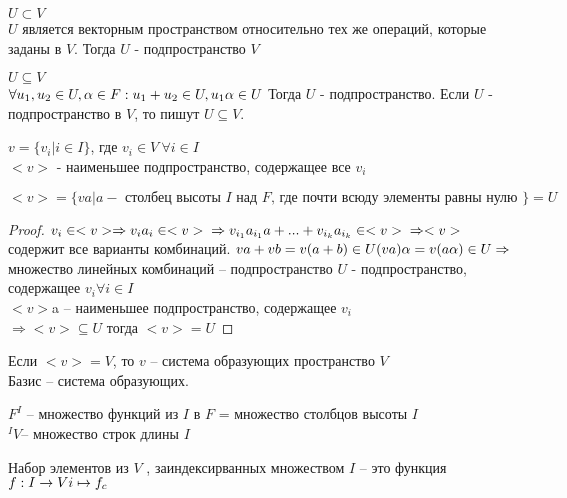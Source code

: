 \documentclass[12pt]{report}
\begin{document}
\begin{note}
$U \subset V$\\
$U$ является векторным пространством относительно тех же операций, которые заданы в $V$.
Тогда $U$ - подпространство $V$\\
\end{note}

\begin{lm}
$U \subseteq V$\\
$\forall u_1, u_2 \in U, \alpha \in F:\\
u_1+u_2 \in U, u_1 \alpha \in U$
Тогда $U$ - подпространство.
Если $U$ - подпространство в $V$, то пишут $U \subseteq V$.\\
\end{lm}

\begin{defn}
$v = \{v_i | i \in I\}$, где $v_i \in V \: \forall i \in I$\\
$<v>$ - наименьшее подпространство, содержащее все $v_i$
\end{defn}

\begin{lm}
$<v> = \{va | a - \mbox{ столбец высоты } I \mbox{ над } F \mbox{, где почти всюду элементы равны нулю }\} = U$
\end{lm}
\begin{proof}
$v_i \in <v> \Rightarrow v_i a_i \in <v>\\
\Rightarrow v_{i_1} a_{i_1}a+ ... + v_{i_k} a_{i_k} \in <v>\\
\Rightarrow <v> $ содержит все варианты комбинаций.
$va + vb = v(a+b) \in U \\
(va)\alpha = v(a\alpha )\in U\\
\Rightarrow$ множество линейных комбинаций  -- подпространство 
$U$ - подпространство, содержащее $v_i \forall i \in I$\\
$<v> $a -- наименьшее подпространство, содержащее $v_i$\\
$\Rightarrow <v> \subseteq U$
тогда $<v> = U$
\end{proof}

\begin{defn}
Если $<v> = V$, то $v$ -- система образующих пространство $V$\\
Базис -- система образующих.
\end{defn}

\begin{name}
$F^I$ -- множество функций из $I$ в $F$ = множество столбцов высоты $I$\\
$ ^I V $--  множество строк длины $I$

Набор элементов из $V$ ,  заиндексирванных множеством $I$ -- это функция $f: I \to V \\ i \mapsto f_c$
\end{name}
\end{document}
